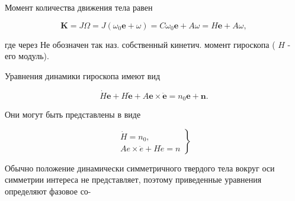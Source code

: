 \documentclass[10pt]{article}
\begin{document}
Момент количества движения тела равен



\[

\boldsymbol{K}=J \Omega=J\left(\omega_{0} \boldsymbol{e}+\omega\right)=C \omega_{0} \boldsymbol{e}+A \omega=H \boldsymbol{e}+A \omega,

\]



где через Не обозначен так наз. собственный кинетич. момент гироскопа ( $H$ - его модуль).



Уравнения динамики гироскопа имеют вид



\[

\dot{H} \boldsymbol{e}+H \dot{\boldsymbol{e}}+A \boldsymbol{e} \times \ddot{\boldsymbol{e}}=n_{0} \boldsymbol{e}+\boldsymbol{n} .

\]



Они могут быть представлены в виде



\[

\left.\begin{array}{l}

\dot{H}=n_{0}, \\

A e \times \ddot{e}+H \dot{e}=n

\end{array}\right\}

\]



Обычно положение динамически симметричного твердого тела вокруг оси симметрии интереса не представляет, поэтому приведенные уравнения определяют фазовое со-
\end{document}
